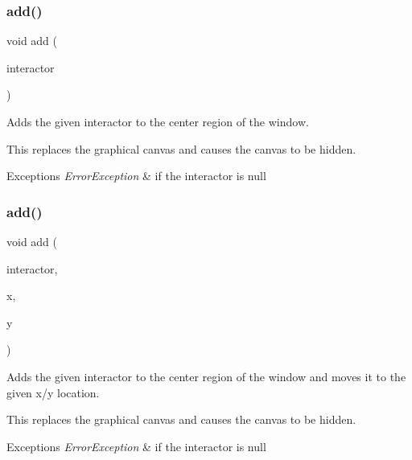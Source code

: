 \subsubsection{\texorpdfstring{add()}{add()}\hspace{0.1cm}{\footnotesize\ttfamily [1/8]}}
{\footnotesize\ttfamily void add (\begin{DoxyParamCaption}\item[{\mbox{\hyperlink{classGInteractor}{G\+Interactor}} $\ast$}]{interactor }\end{DoxyParamCaption})\hspace{0.3cm}{\ttfamily [virtual]}}



Adds the given interactor to the center region of the window. 

This replaces the graphical canvas and causes the canvas to be hidden. 
\begin{DoxyExceptions}{Exceptions}
{\em Error\+Exception} & if the interactor is null \\
\hline
\end{DoxyExceptions}
\mbox{\label{classGWindow_aca25fb0fc7d200e9c4fd23830d2d413d}} 
\subsubsection{\texorpdfstring{add()}{add()}\hspace{0.1cm}{\footnotesize\ttfamily [2/8]}}
{\footnotesize\ttfamily void add (\begin{DoxyParamCaption}\item[{\mbox{\hyperlink{classGInteractor}{G\+Interactor}} $\ast$}]{interactor,  }\item[{double}]{x,  }\item[{double}]{y }\end{DoxyParamCaption})\hspace{0.3cm}{\ttfamily [virtual]}}



Adds the given interactor to the center region of the window and moves it to the given x/y location. 

This replaces the graphical canvas and causes the canvas to be hidden. 
\begin{DoxyExceptions}{Exceptions}
{\em Error\+Exception} & if the interactor is null \\
\hline
\end{DoxyExceptions}
\mbox{\label{classGWindow_a33b08fe5428ed634a658deab076099f7}} 
